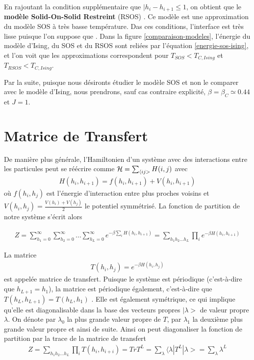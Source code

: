 En rajoutant la condition supplémentaire que $|h_i - h_{i+1} \leq 1$, on obtient que le \textbf{modèle Solid-On-Solid Restreint} (RSOS) \cite{privman_transfer-matrix_1989}. Ce modèle est une approximation du modèle SOS à très basse température.  Das ces conditions, l'interface est très lisse puisque l'on suppose que  \cite{kim_conserved_1994,vaysburd_critical_1995}. Dans la figure \ref{comparaison-modeles}, l'énergie du modèle d'Ising, du SOS et du RSOS sont reliées par l'équation \ref{energie-sos-ising}, et l'on voit que les approximations correspondent pour $T_{SOS} \less T_{C,Ising}$ et $T_{RSOS} \less T_{C,Ising}$. 

Par la suite, puisque nous désironts étudier le modèle SOS et non le comparer avec le modèle d'Ising, nous prendrons, sauf cas contraire explicité, $\beta = \beta_C \simeq 0.44$ et $J=1$. 

  \section{Matrice de Transfert}

	De manière plus générale, l'Hamiltonien d'un système avec des interactions entre les particules peut se réécrire comme $\mathcal{H} = \sum_{\langle ij >} H(i,j)$ avec
\begin{align*}
  H(h_i,h_{i+1}) = f(h_i,h_{i+1}) + V(h_i,h_{i+1}) 
\end{align*}
où $f(h_i,h_j)$ est l'énergie d'interaction entre plus proches voisins et $V(h_i,h_j)=\frac{V(h_i)+V(h_j)}{2}$ le potentiel symmétrisé.
La fonction de partition de notre système s'écrit alors 

\begin{align*}
 Z = \sum_{h_1=0}^\infty \sum_{h_2=0}^\infty ... \sum_{h_L=0}^\infty e^{- \beta \sum_{i} H(h_i,h_{i+1})}  
   = \sum_{h_1 h_2 ... h_L} \prod_{i} e^{-\beta H(h_i,h_{i+1})} 
\end{align*}

La matrice 
\begin{align}
    T(h_i,h_j) = e^{-\beta H(h_i,h_j)}
    \label{matric-transfert}
\end{align}
est appelée matrice de transfert. Puisque le système est périodique (c'est-à-dire que $h_{L+1} = h_1$),  la matrice est périodique également, c'est-à-dire que $T(h_L,h_{L+1}) = T(h_L,h_1)$ \cite{pearce_exact_1989}. Elle est également symétrique, ce qui implique qu'elle est diagonalisable dans la base des vecteurs propres $|\lambda >$ de valeur propre $\lambda$. On dénote par $\lambda_0$ la plus grande valeur propre de $T$, par $\lambda_1$ la deuxième plus grande valeur propre et ainsi de suite.
Ainsi on peut diagonaliser la fonction de partition par la trace de la matrice de transfert \cite{abraham_transfer_1973}
\begin{align}
  Z = \sum_{h_1 h_2 ... h_L} \prod_{i} T(h_i,h_{i+i}) = Tr T^L  = \sum_\lambda \langle\lambda | T^L | \lambda> = \sum_\lambda \lambda^L
  \label{partition-trace-lambda}
\end{align}


